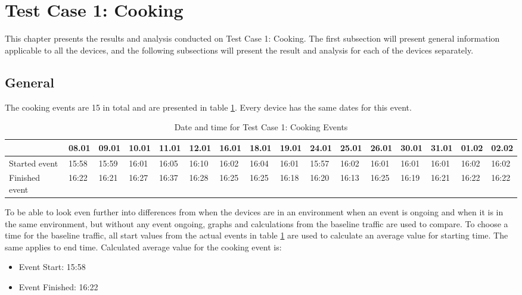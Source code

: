 \section{Test Case 1: Cooking}
This chapter presents the results and analysis conducted on Test Case 1: Cooking. The first subsection will present general information applicable to all the devices, and the following subsections will present the result and analysis for each of the devices separately. 
\subsection{General}
The cooking events are 15 in total and are presented in table \ref{tab:CookingDates}. Every device has the same dates for this event. 
\begin{table}[!hbtp]
    \centering
    \caption{Date and time for Test Case 1: Cooking Events}
    \begin{adjustbox}{width=1\textwidth}
            \begin{tabular}{l|l|l|l|l|l|l|l|l|l|l|l|l|l|l|l|}
            \cline{2-16} 
            & 08.01 & 09.01 & 10.01 & 11.01 & 12.01 & 16.01 & 18.01 & 19.01 & 24.01 & 25.01 & 26.01 & 30.01 & 31.01 & 01.02 & 02.02 \\
            \hline
            \multicolumn{1}{|l|}{Started event}  & 15:58 & 15:59 & 16:01 & 16:05 & 16:10 & 16:02 & 16:04 & 16:01 & 15:57 & 16:02 & 16:01 & 16:01 & 16:01 & 16:02 & 16:02 \\ 
            \hline
            \multicolumn{1}{|l|}{Finished event} & 16:22 & 16:21 & 16:27 & 16:37 & 16:28 & 16:25 & 16:25 & 16:18 & 16:20 & 16:13 & 16:25 & 16:19 & 16:21 & 16:22 & 16:22 \\ 
            \hline
            \end{tabular}
    \end{adjustbox}
    \label{tab:CookingDates}
\end{table}
\FloatBarrier

To be able to look even further into differences from when the devices are in an environment when an event is ongoing and when it is in the same environment, but without any event ongoing, graphs and calculations from the baseline traffic are used to compare. To choose a time for the baseline traffic, all start values from the actual events in table \ref{tab:CookingDates} are used to calculate an average value for starting time. The same applies to end time. Calculated average value for the cooking event is:

\begin{itemize}
    \item Event Start: 15:58
    \item Event Finished: 16:22
\end{itemize}


